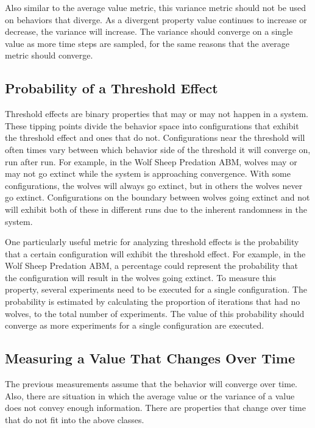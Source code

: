 Also similar to the average value metric, this variance metric should not be used on behaviors that diverge.
As a divergent property value continues to increase or decrease, the variance will increase.
The variance should converge on a single value as more time steps are sampled, for the same reasons that the average metric should converge.


\subsection{Probability of a Threshold Effect}
Threshold effects are binary properties that may or may not happen in a system.
These tipping points divide the behavior space into configurations that exhibit the threshold effect and ones that do not.
Configurations near the threshold will often times vary between which behavior side of the threshold it will converge on, run after run.
For example, in the Wolf Sheep Predation ABM, wolves may or may not go extinct while the system is approaching convergence.
With some configurations, the wolves will always go extinct, but in others the wolves never go extinct.
Configurations on the boundary between wolves going extinct and not will exhibit both of these in different runs due to the inherent randomness in the system.

One particularly useful metric for analyzing threshold effects is the probability that a certain configuration will exhibit the threshold effect.
For example, in the Wolf Sheep Predation ABM, a percentage could represent the probability that the configuration will result in the wolves going extinct.
To measure this property, several experiments need to be executed for a single configuration. 
The probability is estimated by calculating the proportion of iterations that had no wolves, to the total number of experiments.
The value of this probability should converge as more experiments for a single configuration are executed.




\subsection{Measuring a Value That Changes Over Time}
The previous measurements assume that the behavior will converge over time.
Also, there are situation in which the average value or the variance of a value does not convey enough information.
There are properties that change over time that do not fit into the above classes.


